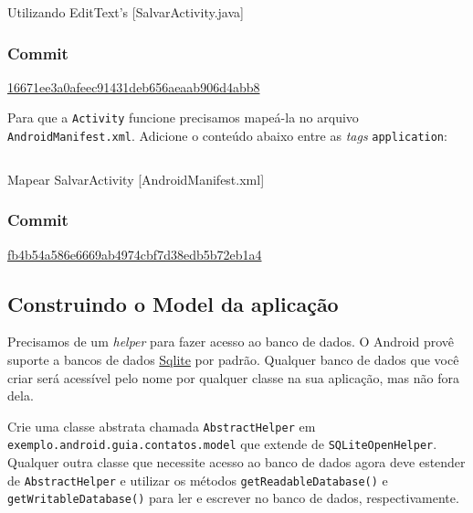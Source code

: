 \begin{listing}[H]
  \inputminted[linenos=true,frame=bottomline,tabsize=3]{ java }{ source/SalvarActivity-1.java }
  \caption{Utilizando EditText's [SalvarActivity.java]}
\end{listing}

\subsubsection{Commit}

\href{https://github.com/atilacamurca/guia-aberto-android-contatos/commit/16671ee3a0afeec91431deb656aeaab906d4abb8}{16671ee3a0afeec91431deb656aeaab906d4abb8}

\bigskip

Para que a \texttt{Activity} funcione precisamos mapeá-la no arquivo
\texttt{AndroidManifest.xml}. Adicione o conteúdo abaixo entre as
\emph{tags} \texttt{application}:

\begin{listing}[H]
  \inputminted[linenos=true,frame=bottomline,tabsize=3]{ xml }{ source/AndroidManifest-2.xml }
  \caption{Mapear SalvarActivity [AndroidManifest.xml]}
\end{listing}

\subsubsection{Commit}

\href{https://github.com/atilacamurca/guia-aberto-android-contatos/commit/fb4b54a586e6669ab4974cbf7d38edb5b72eb1a4}{fb4b54a586e6669ab4974cbf7d38edb5b72eb1a4}

\subsection{Construindo o Model da aplicação \label{ssec:model}}

Precisamos de um \emph{helper} para fazer acesso ao banco de dados. O
Android provê suporte a bancos de dados
\href{http://sqlite.org/}{Sqlite} por padrão. Qualquer banco de dados
que você criar será acessível pelo nome por qualquer classe na sua
aplicação, mas não fora dela.

Crie uma classe abstrata chamada \texttt{AbstractHelper} em
\texttt{exemplo.android.guia.contatos.model} que extende de
\texttt{SQLiteOpenHelper}. Qualquer outra classe que necessite acesso ao
banco de dados agora deve estender de \texttt{AbstractHelper} e utilizar
os métodos \texttt{getReadableDatabase()} e
\texttt{getWritableDatabase()} para ler e escrever no banco de dados,
respectivamente.

